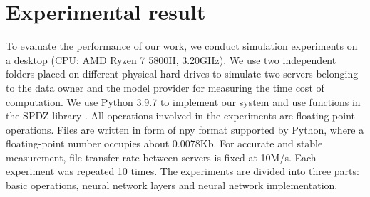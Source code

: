 \documentclass[letterpaper]{article} %
\begin{document}
    \begin{table}[!ht]

        \caption{Overhead of 2PC schemes for different tasks ($32$-bits input vlaue and $\kappa=128$ )}
        \label{Overhead of methods}
    \end{table}


    \section{Experimental result}
    To evaluate the performance of our work, we conduct simulation experiments on a desktop (CPU: AMD Ryzen 7 5800H, 3.20GHz).
    We use two independent folders placed on different physical hard drives to simulate two servers belonging to the
    data owner and the model provider for measuring the time cost of computation.
    We use Python 3.9.7 to implement our system and use functions in the SPDZ library \cite{SPDZ}.
    All operations involved in the experiments are floating-point operations.
    Files are written in form of npy format supported by Python, where a floating-point number occupies about 0.0078Kb.
    For accurate and stable measurement, file transfer rate between servers is fixed at 10M/s.
    Each experiment was repeated 10 times.
    The experiments are divided into three parts: basic operations, neural network layers and neural network implementation.
\end{document}
